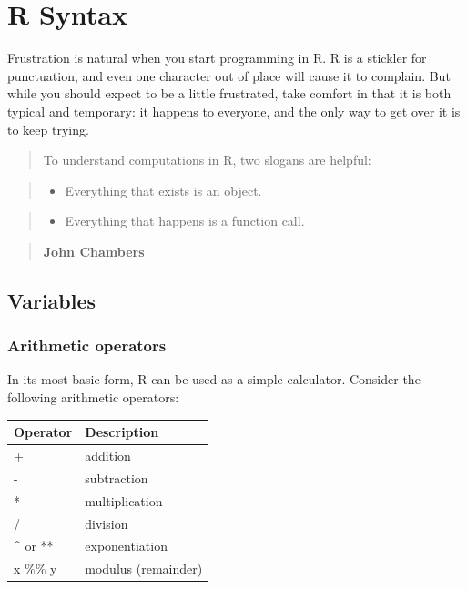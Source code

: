 \documentclass[]{book}
\providecommand{\tightlist}{%
  \setlength{\itemsep}{0pt}\setlength{\parskip}{0pt}}
\begin{document}
\chapter{R Syntax}\label{r-syntax}

Frustration is natural when you start programming in R. R is a stickler
for punctuation, and even one character out of place will cause it to
complain. But while you should expect to be a little frustrated, take
comfort in that it is both typical and temporary: it happens to
everyone, and the only way to get over it is to keep trying.

\begin{quote}
To understand computations in R, two slogans are helpful:
\end{quote}

\begin{quote}
\begin{itemize}
\tightlist
\item
  Everything that exists is an object.
\end{itemize}
\end{quote}

\begin{quote}
\begin{itemize}
\tightlist
\item
  Everything that happens is a function call.
\end{itemize}
\end{quote}

\begin{quote}
\textbf{John Chambers}
\end{quote}

\section{Variables}\label{variables}

\subsection{Arithmetic operators}\label{arithmetic-operators}

In its most basic form, R can be used as a simple calculator. Consider
the following arithmetic operators:

\begin{longtable}[]{@{}ll@{}}
\toprule
Operator & Description\tabularnewline
\midrule
\endhead
+ & addition\tabularnewline
- & subtraction\tabularnewline
* & multiplication\tabularnewline
/ & division\tabularnewline
\^{} or ** & exponentiation\tabularnewline
x \%\% y & modulus (remainder)\tabularnewline
\bottomrule
\end{longtable}
\end{document}
